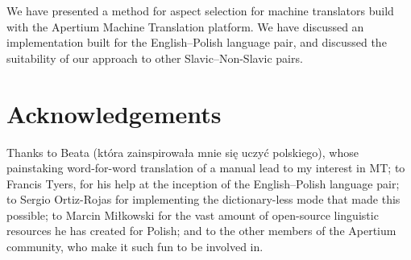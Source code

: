 \documentclass[11pt]{article}
\begin{document}
We have presented a method for aspect selection for machine translators
build with the Apertium Machine Translation platform. We have discussed
an implementation built for the English--Polish language pair, and
discussed the suitability of our approach to other Slavic--Non-Slavic 
pairs.

\section{Acknowledgements}

Thanks to Beata (kt\'{o}ra zainspirowa\l{}a mnie si\k{e} uczy\'{c} polskiego),
whose painstaking word-for-word translation of a manual lead to my 
interest in MT; to Francis Tyers, for his help at the inception of the
English--Polish language pair; to Sergio Ortiz-Rojas for implementing the
dictionary-less mode that made this possible; to Marcin Mi\l{}kowski for
the vast amount of open-source linguistic resources he has created for Polish;
and to the other members of the Apertium
community, who make it such fun to be involved in.



\end{document}
